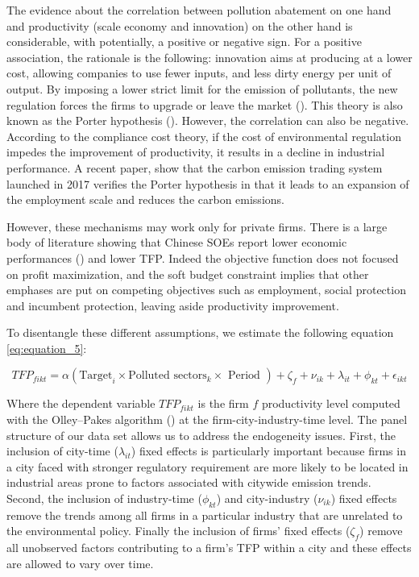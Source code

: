 \documentclass[12pt]{article}
\begin{document}
The evidence about the correlation between pollution abatement on one hand and productivity (scale economy and innovation) on the other hand is considerable, with potentially, a positive or negative sign. For a positive association, the rationale is the following: innovation aims at producing at a lower cost, allowing companies to use fewer inputs, and less dirty energy per unit of output. By imposing a lower strict limit for the emission of pollutants, the new regulation forces the firms to upgrade or leave the market (\citealt{Andersen2016-pa,Andersen2017-wf,Cole2008-pj}). This theory is also known as the Porter hypothesis (\citealt{Porter1995-vr}). However, the correlation can also be negative. According to the compliance cost theory, if the cost of environmental regulation impedes the improvement of productivity, it results in a decline in industrial performance. A recent paper, \cite{Yang2020-uw} show that the carbon emission trading system launched in 2017 verifies the Porter hypothesis in that it leads to an expansion of the employment scale and reduces the carbon emissions. 


However, these mechanisms may work only for private firms. There is a large body of literature showing that Chinese SOEs report lower economic performances (\citealt{Zhang2004-ij,Dougherty2007-qu,Qian1996-ab}) and lower TFP. Indeed the objective function does not focused on profit maximization, and the soft budget constraint implies that other emphases are put on competing objectives such as employment, social protection and incumbent protection, leaving aside productivity improvement. 

To disentangle these different assumptions, we estimate the following equation \ref{eq:equation_5}:

\begin{equation} \label{eq:equation_5}
TFP_{fikt}=\alpha\left(\text {Target}_{i} \times \text {Polluted sectors}_{k} \times \text { Period }\right)+ \zeta_{f}+ \nu_{i k}+\lambda_{i t}+\phi_{k t}+\epsilon_{i k t}
\end{equation}

Where the dependent variable $TFP_{fikt }$ is the firm $f$ productivity level computed with the Olley–Pakes algorithm (\citealt{Olley1996-yl}) at the firm-city-industry-time level. The panel structure of our data set allows us to address the endogeneity issues. First, the inclusion of city-time ($\lambda_{i t}$) fixed effects is particularly important because firms in a city faced with stronger regulatory requirement are more likely to be located in industrial areas prone to factors associated with citywide emission trends. Second, the inclusion of industry-time ($\phi_{k t}$) and city-industry ($\nu_{i k}$) fixed effects remove the trends among all firms in a particular industry that are unrelated to the environmental policy. Finally the inclusion of firms' fixed effects ($\zeta_{f}$) remove all unobserved factors contributing to a firm's TFP within a city and these effects are allowed to vary over time. 
\end{document}

